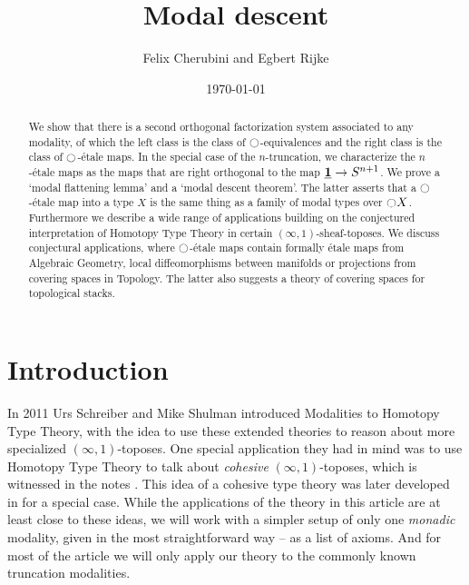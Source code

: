 \documentclass[9pt,twosided]{amsart}
\title{Modal descent}
\author{Felix Cherubini and Egbert Rijke}
\date{\today}
\begin{document}
\maketitle

\begin{abstract}
  We show that there is a second orthogonal factorization system associated to any modality, of which the left class is the class of ${\ocircle}$-equivalences and the right class is the class of ${\ocircle}$-\'etale maps. In the special case of the $n$-truncation, we characterize the $n$-\'etale maps as the maps that are right orthogonal to the map $\underline{\mathbf{1}} \to S^{n+1}$. We prove a `modal flattening lemma' and a `modal descent theorem'. The latter asserts that a ${\ocircle}$-\'etale map into a type $X$ is the same thing as a family of modal types over ${\ocircle} X$. Furthermore we describe a wide range of applications building on the conjectured interpretation of Homotopy Type Theory in certain $(\infty,1)$-sheaf-toposes. We discuss conjectural applications, where ${\ocircle}$-étale maps contain formally étale maps from Algebraic Geometry, local diffeomorphisms between manifolds or projections from covering spaces in Topology. The latter also suggests a theory of covering spaces for topological stacks.
\end{abstract}

\section{Introduction}
In 2011 Urs Schreiber and Mike Shulman introduced Modalities to Homotopy Type Theory,
with the idea to use these extended theories to reason about more specialized $(\infty,1)$-toposes.
One special application they had in mind was to use Homotopy Type Theory to talk about \emph{cohesive} $(\infty,1)$-toposes,
which is witnessed in the notes \cite{ShulmanSchreiber}.
This idea of a cohesive type theory was later developed in \cite{ShulmanRealCohesion} for a special case.
While the applications of the theory in this article are at least close to these ideas,
we will work with a simpler setup of only one \emph{monadic} modality, given in the most straightforward way -- as a list of axioms.
And for most of the article we will only apply our theory to the commonly known truncation modalities.
  
\end{document}
